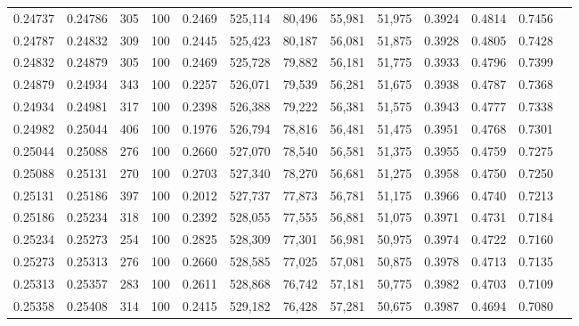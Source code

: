 \begin{tabular}{rrrrrrrrrrrrr}
0.24737 & 0.24786 &   305 & 100 &                                     0.2469 & 525,114 &  80,496 &  55,981 &  51,975 & 0.3924 & 0.4814 & 0.7456 \\
0.24787 & 0.24832 &   309 & 100 &                                     0.2445 & 525,423 &  80,187 &  56,081 &  51,875 & 0.3928 & 0.4805 & 0.7428 \\
0.24832 & 0.24879 &   305 & 100 &                                     0.2469 & 525,728 &  79,882 &  56,181 &  51,775 & 0.3933 & 0.4796 & 0.7399 \\
0.24879 & 0.24934 &   343 & 100 &                                     0.2257 & 526,071 &  79,539 &  56,281 &  51,675 & 0.3938 & 0.4787 & 0.7368 \\
0.24934 & 0.24981 &   317 & 100 &                                     0.2398 & 526,388 &  79,222 &  56,381 &  51,575 & 0.3943 & 0.4777 & 0.7338 \\
0.24982 & 0.25044 &   406 & 100 &                                     0.1976 & 526,794 &  78,816 &  56,481 &  51,475 & 0.3951 & 0.4768 & 0.7301 \\
0.25044 & 0.25088 &   276 & 100 &                                     0.2660 & 527,070 &  78,540 &  56,581 &  51,375 & 0.3955 & 0.4759 & 0.7275 \\
0.25088 & 0.25131 &   270 & 100 &                                     0.2703 & 527,340 &  78,270 &  56,681 &  51,275 & 0.3958 & 0.4750 & 0.7250 \\
0.25131 & 0.25186 &   397 & 100 &                                     0.2012 & 527,737 &  77,873 &  56,781 &  51,175 & 0.3966 & 0.4740 & 0.7213 \\
0.25186 & 0.25234 &   318 & 100 &                                     0.2392 & 528,055 &  77,555 &  56,881 &  51,075 & 0.3971 & 0.4731 & 0.7184 \\
0.25234 & 0.25273 &   254 & 100 &                                     0.2825 & 528,309 &  77,301 &  56,981 &  50,975 & 0.3974 & 0.4722 & 0.7160 \\
0.25273 & 0.25313 &   276 & 100 &                                     0.2660 & 528,585 &  77,025 &  57,081 &  50,875 & 0.3978 & 0.4713 & 0.7135 \\
0.25313 & 0.25357 &   283 & 100 &                                     0.2611 & 528,868 &  76,742 &  57,181 &  50,775 & 0.3982 & 0.4703 & 0.7109 \\
0.25358 & 0.25408 &   314 & 100 &                                     0.2415 & 529,182 &  76,428 &  57,281 &  50,675 & 0.3987 & 0.4694 & 0.7080 \\

\end{tabular}
